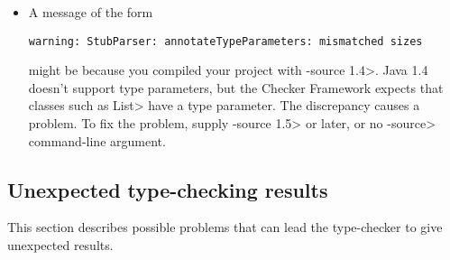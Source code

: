 \begin{itemize}
\item
A message of the form

\begin{Verbatim}
warning: StubParser: annotateTypeParameters: mismatched sizes
\end{Verbatim}

might be because you compiled your project with \<-source 1.4>.  Java 1.4
doesn't support type parameters, but the Checker Framework expects that
classes such as \<List> have a type parameter.  The discrepancy causes a
problem.  To fix the problem, supply \<-source 1.5> or later, or no
\<-source> command-line argument.

\end{itemize}


\subsection{Unexpected type-checking results\label{common-problems-typechecking}}

This section describes possible problems that can lead the type-checker to
give unexpected results.



